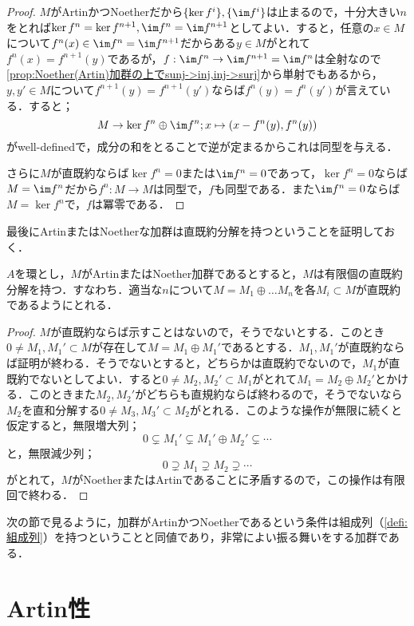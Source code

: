 \begin{proof}
	$M$がArtinかつNoetherだから$\{\ker f^i\},\{\im f^i\}$は止まるので，十分大きい$n$をとれば$\ker f^n=\ker f^{n+1},\im f^n=\im f^{n+1}$としてよい．すると，任意の$x\in M$について$f^n(x)\in\im f^n=\im f^{n+1}$だからある$y\in M$がとれて$f^n(x)=f^{n+1}(y)$であるが，$f:\im f^n\to\im f^{n+1}=\im f^n$は全射なので\ref{prop:Noether(Artin)加群の上でsunj->inj,inj->surj}から単射でもあるから，$y,y'\in M$について$f^{n+1}(y)=f^{n+1}(y')$ならば$f^n(y)=f^n(y')$が言えている．すると；
	\[M\to\ker f^n\oplus\im f^n;x\mapsto(x-f^n(y),f^n(y))\]
	がwell-definedで，成分の和をとることで逆が定まるからこれは同型を与える．
	
	さらに$M$が直既約ならば$\ker f^n=0$または$\im f^n=0$であって，$\ker f^n=0$ならば$M=\im f^n$だから$f^n:M\to M$は同型で，$f$も同型である．また$\im f^n=0$ならば$M=\ker f^n$で，$f$は冪零である．
\end{proof}

最後にArtinまたはNoetherな加群は直既約分解を持つということを証明しておく．

\begin{prop}\label{prop:ArtinまたはNoetherなら直既約分解がある}
	$A$を環とし，$M$がArtinまたはNoether加群であるとすると，$M$は有限個の直既約分解を持つ．すなわち．適当な$n$について$M=M_1\oplus\dots M_n$を各$M_i\subset M$が直既約であるようにとれる．
\end{prop}

\begin{proof}
	$M$が直既約ならば示すことはないので，そうでないとする．このとき$0\neq M_1,M_1'\subset M$が存在して$M=M_1\oplus M_1'$であるとする．$M_1,M_1'$が直既約ならば証明が終わる．そうでないとすると，どちらかは直既約でないので，$M_1$が直既約でないとしてよい．すると$0\neq M_2,M_2'\subset M_1$がとれて$M_1=M_2\oplus M_2'$とかける．このときまた$M_2,M_2'$がどちらも直規約ならば終わるので，そうでないなら$M_2$を直和分解する$0\neq M_3,M_3'\subset M_2$がとれる．このような操作が無限に続くと仮定すると，無限増大列；
	\[0\subsetneq M_1'\subsetneq M_1'\oplus M_2'\subsetneq\cdots\]
	と，無限減少列；
	\[0\supsetneq M_1\supsetneq M_2\supsetneq\cdots\]
	がとれて，$M$がNoetherまたはArtinであることに矛盾するので，この操作は有限回で終わる．
\end{proof}
次の節で見るように，加群がArtinかつNoetherであるという条件は組成列（\ref{defi:組成列}）を持つということと同値であり，非常によい振る舞いをする加群である．
\section{Artin性}

